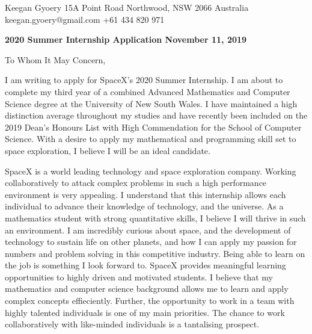 \documentclass[a4paper,11pt]{article}
\begin{document}
\begin{flushright}Keegan Gyoery \break
15A Point Road \break
Northwood, NSW 2066 \break
Australia \break
keegan.gyoery@gmail.com \break
+61 434 820 971 \break
\end{flushright}

\vspace{5mm}
\textbf{2020 Summer Internship Application November 11, 2019} \par
To Whom It May Concern, \par

I am writing to apply for SpaceX’s 2020 Summer Internship. I am about to complete my third year of a combined Advanced Mathematics and Computer Science degree at the University of New South
Wales. I have maintained a high distinction average throughout my studies and have recently been
included on the 2019 Dean’s Honours List with High Commendation for the School of Computer
Science. With a desire to apply my mathematical and programming skill set to space exploration, I believe I will be an ideal candidate.\par

SpaceX is a world leading technology and space exploration company. Working collaboratively to attack complex problems in such a high performance environment is very appealing. I understand that this internship allows each individual to advance their knowledge of technology, and the universe. As a mathematics student with strong quantitative skills, I believe I will thrive in such an environment. I am incredibly curious about space, and the development of technology to sustain life on other planets, and how I can apply my passion for numbers and problem solving in this competitive industry. Being able to learn on the job is something I look forward to. SpaceX provides meaningful learning opportunities to highly driven and motivated students. I believe that my mathematics and computer science background allows me to learn and apply complex concepts effieciently. Further, the opportunity to work in a team with highly talented individuals is one of my main priorities. The chance to work collaboratively with like-minded individuals is a tantalising prospect.
\end{document}
